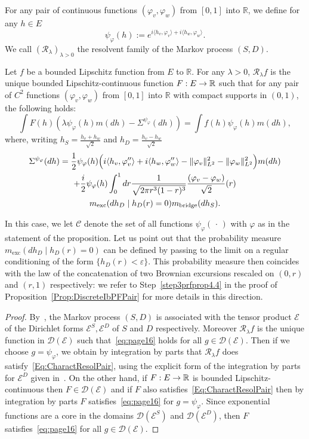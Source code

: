 \documentclass[AHL,Unicode,longabstracts]{cedram}
\theoremstyle{plain}
\newcommand{\cC}{\mathcal{C}}
\newcommand{\cD}{\mathcal{D}}
\newcommand{\cE}{\mathcal{E}}
\newcommand{\cR}{\mathcal{R}}
\newcommand{\R}{\mathbb{R}}
\newcommand{\mBB}{m_{\mathrm{bridge}}}
\newcommand{\mBE}{m_{\mathrm{exc}}}
\newcounter{setofstep}
\newcounter{step}[setofstep]
\renewcommand*{\to}{\mathchoice{\longrightarrow}{\rightarrow}{\rightarrow}{\rightarrow}}
\begin{document}
For any pair of continuous functions $(\varphi_v,\varphi_w)$ from $[0,1]$ into $\R$, we define for any $h\in E$
\[
\psi_\varphi(h):= e^{i \langle h_v,\varphi_v\rangle+i\langle h_w,\varphi_w\rangle}.
\]
We call $(\cR_\lambda)_{\lambda>0}$ the resolvent family of the Markov process $(S,D)$.

\begin{prop}\label{prop:Sigma2int}
Let $f$ be a bounded Lipschitz function from $E$ to $\R$. For any $\lambda > 0$, $\cR_\lambda f$ is the unique bounded Lipschitz-continuous function $F:E\to\R$ such that for any pair of $C^2$ functions $(\varphi_v,\varphi_w)$ from $[0,1]$ into $\R$ with compact supports in $(0,1)$, the following holds:
\begin{equation}\label{Eq:CharactResolPair}
\int F(h) (\lambda \psi_\varphi(h) m(dh) - \Sigma^{\psi_\varphi}(dh)) = \int f(h) \psi_\varphi(h) m(dh),
\end{equation}
where, writing $h_S=\frac{h_v+h_w}{\sqrt{2}}$ and $h_D= \frac{h_v-h_w}{\sqrt{2}}$
\begin{multline}\label{Eq:SigmaPair}
\Sigma^{\psi_\varphi}(dh) = \frac12 \psi_\varphi(h)\Bigl(i \langle h_v,\varphi''_v\rangle + i \langle h_w,\varphi''_w\rangle - \| \varphi_v\|_{L^2}^2 - \| \varphi_w\|_{L^2}^2\Bigr) m(dh)\\
+\frac{i}{2} \psi_\varphi(h)\int_0^1 dr \frac{1}{\sqrt{2\pi r^3(1-r)^3}} \frac{(\varphi_v-\varphi_w)}{\sqrt{2}}(r)\\
\mBE(dh_D \mid h_D(r) = 0)\mBB(dh_S).
\end{multline}
\end{prop}

In this case, we let $\cC$ denote the set of all functions $\psi_\varphi(\,\cdot\,)$ with $\varphi$ as in the statement of the proposition. Let us point out that the probability measure $\mBE(dh_D \mid h_D(r) = 0)$ can be defined by passing to the limit on a regular conditioning of the form $\{h_D(r) < \varepsilon\}$. This probability measure then coincides with the law of the concatenation of two Brownian excursions rescaled on $(0,r)$ and $(r,1)$ respectively: we refer to Step~\ref{step3prfprop4.4} in the proof of Proposition~\ref{Prop:DiscreteIbPFPair} for more details in this direction.

\begin{proof}
By~\cite[chapter~V]{BH91}, the Markov process $(S,D)$ is associated with the tensor product $\cE$ of the Dirichlet forms $\cE^S,\cE^D$ of $S$ and $D$ respectively. Moreover $\cR_\lambda f$ is the unique function in $\cD(\cE)$ such that~\eqref{eq:page16} holds for all $g\in\cD(\cE)$. Then if we choose $g=\psi_\varphi$, we obtain by integration by parts that $\cR_\lambda f$ does satisfy~\eqref{Eq:CharactResolPair}, using the explicit form of the integration by parts for $\cE^D$ given in~\cite{Zambotti2002}. On the other hand, if $F:E\to\R$ is bounded Lipschitz-continuous then $F\in\cD(\cE)$ and if $F$ also satisfies~\eqref{Eq:CharactResolPair} then by integration by parts $F$ satisfies~\eqref{eq:page16} for $g=\psi_\varphi$. Since exponential functions are a core in the domains $\cD(\cE^S)$ and $\cD(\cE^D)$, then $F$ satisfies~\eqref{eq:page16} for all $g\in\cD(\cE)$.
\end{proof}
\end{document}
